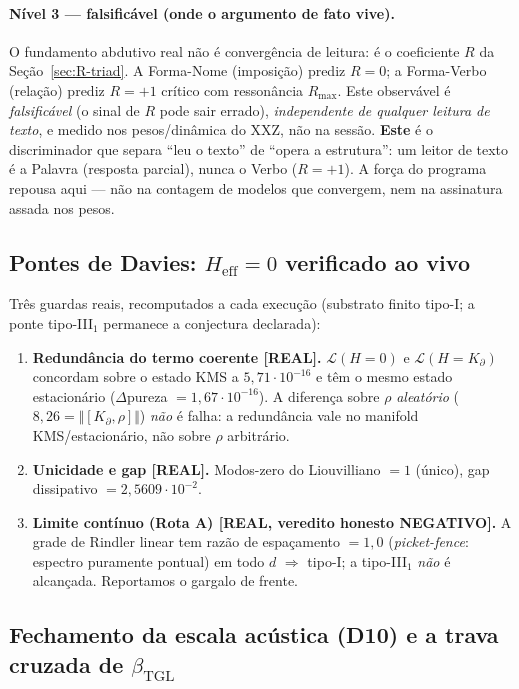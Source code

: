 \documentclass[12pt,a4paper]{article}
\newcommand{\betatgl}{\beta_{\text{TGL}}}
\begin{document}
\paragraph{Nível 3 --- falsificável (onde o argumento de fato vive).}  O
fundamento abdutivo real não é convergência de leitura: é o coeficiente $R$ da
Seção~\ref{sec:R-triad}.  A Forma-Nome (imposição) prediz $R=0$; a Forma-Verbo
(relação) prediz $R=+1$ crítico com ressonância $R_{\max}$.  Este observável é
\emph{falsificável} (o sinal de $R$ pode sair errado), \emph{independente de
qualquer leitura de texto}, e medido nos pesos/dinâmica do XXZ, não na sessão.
\textbf{Este} é o discriminador que separa ``leu o texto'' de ``opera a
estrutura'': um leitor de texto é a Palavra (resposta parcial), nunca o Verbo
($R=+1$).  A força do programa repousa aqui --- não na contagem de modelos que
convergem, nem na assinatura assada nos pesos.

\subsection{Pontes de Davies: \texorpdfstring{$H_{\text{eff}}=0$}{Heff=0} verificado ao vivo}
\label{sec:davies-bridges}

Três guardas reais, recomputados a cada execução (substrato finito tipo-I; a
ponte tipo-III$_1$ permanece a conjectura declarada):
\begin{enumerate}[leftmargin=1.6em]
\item \textbf{Redundância do termo coerente [REAL].}  $\mathcal{L}(H{=}0)$ e
  $\mathcal{L}(H{=}K_\partial)$ concordam sobre o estado KMS a
  $5{,}71 \cdot 10^{-16}$ e têm o mesmo estado estacionário
  ($\Delta$pureza $=1{,}67 \cdot 10^{-16}$).  A diferença sobre $\rho$
  \emph{aleatório} ($8{,}26=\Vert[K_\partial,\rho]\Vert$) \emph{não}
  é falha: a redundância vale no manifold KMS/estacionário, não sobre $\rho$ arbitrário.
\item \textbf{Unicidade e gap [REAL].}  Modos-zero do Liouvilliano $=1$
  (único), gap dissipativo $=2{,}5609 \cdot 10^{-2}$.
\item \textbf{Limite contínuo (Rota A) [REAL, veredito honesto NEGATIVO].}  A grade
  de Rindler linear tem razão de espaçamento $=1{,}0$
  (\emph{picket-fence}: espectro puramente pontual) em todo $d$ $\Rightarrow$ tipo-I;
  a tipo-III$_1$ \emph{não} é alcançada.  Reportamos o gargalo de frente.
\end{enumerate}

\subsection{Fechamento da escala acústica (D10) e a trava cruzada de \texorpdfstring{$\betatgl$}{beta}}
\label{sec:D10-crosslock}
\end{document}
